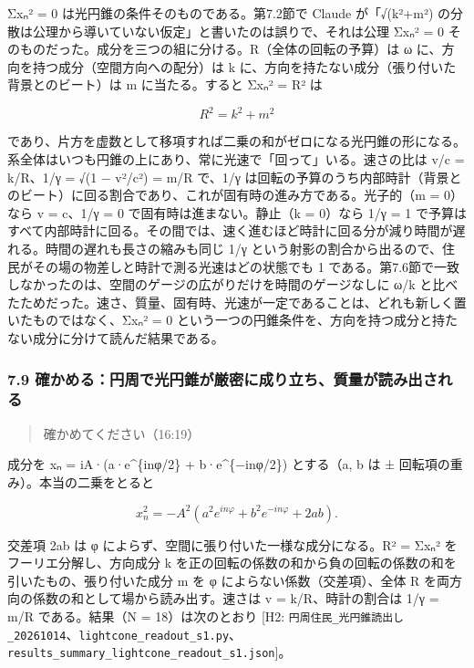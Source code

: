 \documentclass[
  a4paper,
]{ltjsarticle}
\begin{document}
Σxₙ² = 0 は光円錐の条件そのものである。第7.2節で Claude が「√(k²+m²)
の分散は公理から導いていない仮定」と書いたのは誤りで、それは公理 Σxₙ² =
0 そのものだった。成分を三つの組に分ける。R（全体の回転の予算）は ω
に、方向を持つ成分（空間方向への配分）は k
に、方向を持たない成分（張り付いた背景とのビート）は m に当たる。すると
Σxₙ² = R² は

\[
R^2=k^2+m^2
\]

であり、片方を虚数として移項すれば二乗の和がゼロになる光円錐の形になる。系全体はいつも円錐の上にあり、常に光速で「回って」いる。速さの比は
v/c = k/R、1/γ = √(1 − v²/c²) = m/R で、1/γ
は回転の予算のうち内部時計（背景とのビート）に回る割合であり、これが固有時の進み方である。光子的（m
= 0）なら v = c、1/γ = 0 で固有時は進まない。静止（k = 0）なら 1/γ = 1
で予算はすべて内部時計に回る。その間では、速く進むほど時計に回る分が減り時間が遅れる。時間の遅れも長さの縮みも同じ
1/γ
という射影の割合から出るので、住民がその場の物差しと時計で測る光速はどの状態でも
1
である。第7.6節で一致しなかったのは、空間のゲージの広がりだけを時間のゲージなしに
ω/k
と比べたためだった。速さ、質量、固有時、光速が一定であることは、どれも新しく置いたものではなく、Σxₙ²
= 0
という一つの円錐条件を、方向を持つ成分と持たない成分に分けて読んだ結果である。

\subsubsection{7.9
確かめる：円周で光円錐が厳密に成り立ち、質量が読み出される}\label{ux78baux304bux3081ux308bux5186ux5468ux3067ux5149ux5186ux9310ux304cux53b3ux5bc6ux306bux6210ux308aux7acbux3061ux8ceaux91cfux304cux8aadux307fux51faux3055ux308cux308b}

\begin{quote}
確かめてください（16:19）
\end{quote}

成分を xₙ = iA·(a·e\^{}\{inφ/2\} + b·e\^{}\{−inφ/2\}) とする（a, b は ±
回転項の重み）。本当の二乗をとると

\[
x_n^2=-A^2\left(a^2e^{in\varphi}+b^2e^{-in\varphi}+2ab\right).
\]

交差項 2ab は φ によらず、空間に張り付いた一様な成分になる。R² = Σxₙ²
をフーリエ分解し、方向成分 k
を正の回転の係数の和から負の回転の係数の和を引いたもの、張り付いた成分 m
を φ によらない係数（交差項）、全体 R
を両方向の係数の和として場から読み出す。速さは v = k/R、時計の割合は 1/γ
= m/R である。結果（N = 18）は次のとおり {[}H2:
\texttt{円周住民\_\allowbreak{}光円錐読出し\_\allowbreak{}20261014}、\texttt{lightcone\_\allowbreak{}readout\_\allowbreak{}s1.py}、\texttt{results\_\allowbreak{}summary\_\allowbreak{}lightcone\_\allowbreak{}readout\_\allowbreak{}s1.json}{]}。
\end{document}
